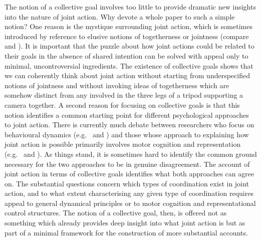 \documentclass[12pt,a4paper]{extarticle}
\begin{document}
The notion of a collective goal involves too little to provide dramatic new insights into the nature of joint action.
Why devote a whole paper to such a simple notion?
One reason is the mystique surrounding joint action, which is sometimes introduced by reference to elusive notions of togetherness or jointness (compare 
	\citealp{gilbert_walking_1990} and
	\citealp[p.\ 150]{Bratman:2009lv}%
).
It is important that the puzzle about how joint actions could be related to their goals in the absence of shared intention can be solved with appeal only to minimal, uncontroversial ingredients.
The existence of collective goals shows that we can coherently think about joint action without starting from underspecified notions of jointness and without invoking ideas of togetherness which are somehow distinct from any involved in the three legs of a tripod supporting a camera together.
A second reason for focusing on collective goals 
	is that this notion identifies a common starting point for different psychological approaches to joint action.
There is currently much debate between researchers who focus on behavioural dynamics 
(e.g.\ 
	\citealp{marsh_social_2009} and
	\citealp{schmidt_richardons:_2008}%
)
and those whose approach to explaining how joint action is possible primarily involves motor cognition and representation (e.g.\ 
	\citealp{Sebanz:2005fk} and
	\citealp{Knoblich:2006bn}%
).
As things stand, it is sometimes hard to identify the common ground necessary for the two approaches to be in genuine disagreement.
The account of joint action in terms of collective goals identifies what both approaches can agree on. 
The substantial questions concern which types of coordination exist in joint action, 
	and to what extent characterising any given type of coordination requires appeal to general dynamical principles or to motor cognition and representational control structures.
The notion of a collective goal, then, is offered  not as something which already provides deep insight into what joint action is but as part of a minimal framework for the construction of more substantial accounts.
\end{document}
